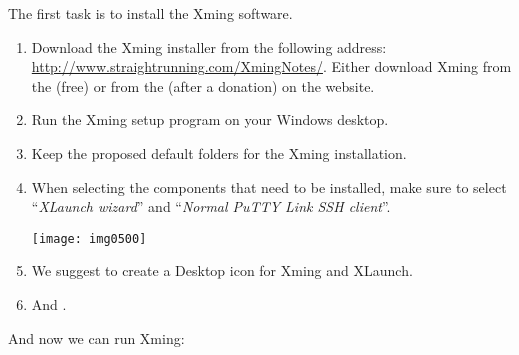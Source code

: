   The first task is to install the Xming software.

  \begin{enumerate}
    \item  Download the Xming installer from the following
      address: \url{http://www.straightrunning.com/XmingNotes/}. Either download Xming
      from the  (free) or from the  (after a donation) on the website.
    \item  Run the Xming setup program on your Windows desktop.
    \item  Keep the proposed default folders for the Xming installation.
    \item  When selecting the components that need to be installed, make sure to
      select ``\emph{XLaunch wizard}'' and ``\emph{Normal PuTTY Link SSH client}''.

  \texttt{[image: img0500]}

  \item  We suggest to create a Desktop icon for Xming and XLaunch.
  \item  And .
  \end{enumerate}

  And now we can run Xming:

